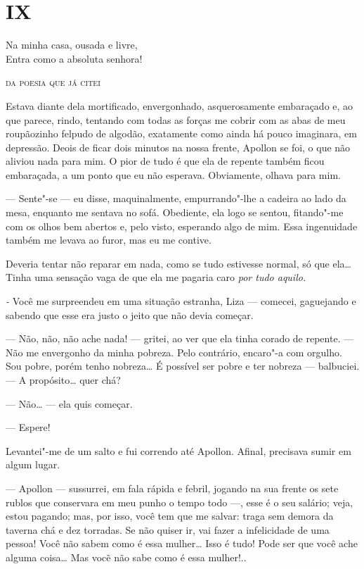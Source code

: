 \section{IX}

\epigraph{Na minha casa, ousada e livre,\\
Entra como a absoluta senhora!}{\textsc{da poesia que já citei}}

Estava diante dela mortificado, envergonhado, asquerosamente embaraçado
e, ao que parece, rindo, tentando com todas as forças me cobrir com as
abas de meu roupãozinho felpudo de algodão, exatamente como ainda há
pouco imaginara, em depressão. Deois de ficar dois minutos na nossa
frente, Apollon se foi, o que não aliviou nada para mim. O pior de tudo
é que ela de repente também ficou embaraçada, a um ponto que eu não
esperava. Obviamente, olhava para mim.

--- Sente"-se --- eu disse, maquinalmente, empurrando"-lhe a cadeira ao lado
da mesa, enquanto me sentava no sofá. Obediente, ela logo se sentou,
fitando"-me com os olhos bem abertos e, pelo visto, esperando algo de
mim. Essa ingenuidade também me levava ao furor, mas eu me contive.

Deveria tentar não reparar em nada, como se tudo estivesse normal, só
que ela\ldots{} Tinha uma sensação vaga de que ela me pagaria caro \emph{por
tudo aquilo.}

\emph{-} Você me surpreendeu em uma situação estranha, Liza --- comecei,
gaguejando e sabendo que esse era justo o jeito que não devia começar.

--- Não, não, não ache nada! --- gritei, ao ver que ela tinha corado de
repente. --- Não me envergonho da minha pobreza. Pelo contrário, encaro"-a
com orgulho. Sou pobre, porém tenho nobreza\ldots{} É possível ser pobre e
ter nobreza --- balbuciei. --- A propósito\ldots{} quer chá?

--- Não\ldots{} --- ela quis começar.

--- Espere!

Levantei"-me de um salto e fui correndo até Apollon. Afinal, precisava
sumir em algum lugar.

--- Apollon --- sussurrei, em fala rápida e febril, jogando na sua frente
os sete rublos que conservara em meu punho o tempo todo ---, esse é o seu
salário; veja, estou pagando; mas, por isso, você tem que me salvar:
traga sem demora da taverna chá e dez torradas. Se não quiser ir, vai
fazer a infelicidade de uma pessoa! Você não sabem como é essa mulher\ldots{}
Isso é tudo! Pode ser que você ache alguma coisa\ldots{} Mas vocẽ não sabe
como é essa mulher!..

